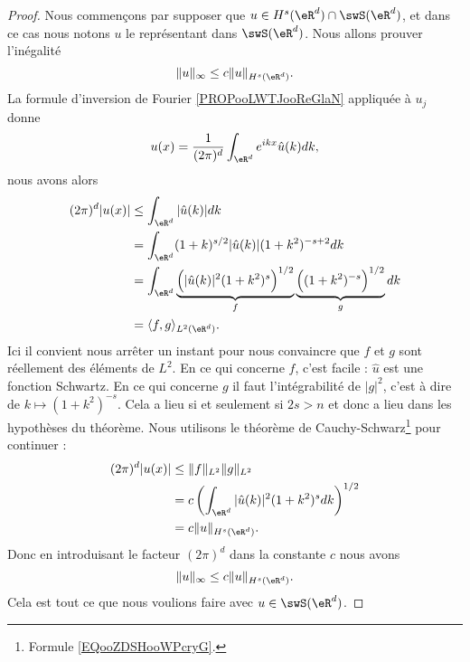 \begin{proof}
    Nous commençons par supposer que \( u\in H^s(\eR^d)\cap \swS(\eR^d)\), et dans ce cas nous notons \( u\) le représentant dans \( \swS(\eR^d)\). Nous allons prouver l'inégalité
    \begin{equation}
        \| u \|_{\infty}\leq c\| u \|_{H^s(\eR^d)}.
    \end{equation}
    La formule d'inversion de Fourier \ref{PROPooLWTJooReGlaN} appliquée à \( u_j\) donne
    \begin{equation}        \label{EQooDKYDooAxThqf}
        u(x)=\frac{1}{ (2\pi)^d }\int_{\eR^d} e^{ikx}\hat u(k)dk,
    \end{equation}
    nous avons alors
    \begin{subequations}
        \begin{align}
            (2\pi)^d| u(x) |&\leq\int_{\eR^d}| \hat u(k) |dk\\
            &=\int_{\eR^d}(1+k)^{s/2}| \hat u(k) |(1+k^2)^{-s+2}dk\\
            &=\int_{\eR^d}\underbrace{\Big( | \hat u(k) |^2(1+k^2)^s \Big)^{1/2}}_{f}\underbrace{\Big( (1+k^2)^{-s} \Big)^{1/2}}_{g}dk\\
            &=\langle f, g\rangle_{L^2(\eR^d)}.
        \end{align}
    \end{subequations}
    Ici il convient nous arrêter un instant pour nous convaincre que \( f\) et \( g\) sont réellement des éléments de \( L^2\). En ce qui concerne \( f\), c'est facile : \( \hat u\) est une fonction Schwartz. En ce qui concerne \( g\) il faut l'intégrabilité de \( | g |^2\), c'est à dire de \( k\mapsto (1+k^2)^{-s}\). Cela a lieu si et seulement si \(2s>n\) et donc a lieu dans les hypothèses du théorème. Nous utilisons le théorème de Cauchy-Schwarz\footnote{Formule \ref{EQooZDSHooWPcryG}.} pour continuer :
    \begin{subequations}
        \begin{align}
            (2\pi)^d| u(x) |&\leq \| f \|_{L^2}\| g \|_{L^2}\\
            &=c\left( \int_{\eR^d}| \hat u(k) |^2(1+k^2)^sdk \right)^{1/2}\\
            &=c\| u \|_{H^s(\eR^d)}.
        \end{align}
    \end{subequations}
    Donc en introduisant le facteur \( (2\pi)^d\) dans la constante \( c\) nous avons
    \begin{equation}
        \| u \|_{\infty}\leq c\| u \|_{H^s(\eR^d)}.
    \end{equation}
    Cela est tout ce que nous voulions faire avec \( u\in \swS(\eR^d)\). 
    

\end{proof}
